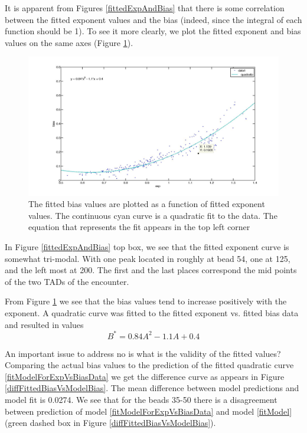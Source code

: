 \documentclass[12pt]{paper}
\begin{document}
It is apparent from Figures \ref{fittedExpAndBias} that there is some correlation between the fitted exponent values and the bias (indeed, since the integral of each function should be 1). To see it more clearly, we plot the fitted exponent and bias values on the same axes (Figure \ref{fittedExpVsFittedBias}). 
\begin{figure}[H]\label{fittedExpVsFittedBias}
{\includegraphics[scale=0.15]{fittedExpVsFittedBias}
\caption{\scriptsize{The fitted bias values are plotted as a function of fitted exponent values. The continuous cyan curve is a quadratic fit to the data. The equation that represents the fit appears in the top left corner}}
}
\end{figure}
In Figure \ref{fittedExpAndBias} top box, we see that the fitted exponent curve is somewhat tri-modal. With one peak located in roughly at bead 54, one at 125, and the left most at 200. The first and the last places correspond the mid points of the two TADs of the encounter. 

From Figure \ref{fittedExpVsFittedBias} we see that the bias values tend to increase positively with the exponent. A quadratic curve was fitted to the fitted exponent vs. fitted bias data and resulted in values
\begin{equation}\label{fitModelForExpVsBiasData}
B^* = 0.84A^2-1.1A+0.4
\end{equation}

 An important issue to address no is what is the validity of the fitted values?
Comparing the actual bias values to the prediction of the fitted quadratic curve \ref{fitModelForExpVsBiasData} we get the difference curve as appears in Figure \ref{diffFittedBiasVsModelBias}. The mean difference between model predictions and model fit is 0.0274. We see that for the beads 35-50 there is a disagreement between prediction of model \ref{fitModelForExpVsBiasData} and model \ref{fitModel} (green dashed box in Figure \ref{diffFittedBiasVsModelBias}). 
\end{document}
